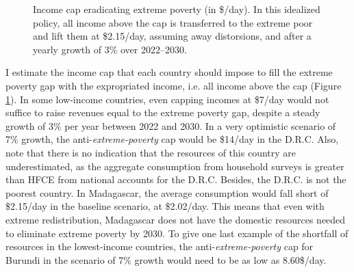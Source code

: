 \documentclass[12pt,english]{article}
\begin{document}
\begin{figure}[!b]
  \caption[Anti-\textit{extreme-poverty} cap in 2030 after 3\% growth.]{Income cap eradicating extreme poverty (in \$/day). In this idealized policy, all income above the cap is transferred to the extreme poor and lift them at \$2.15/day, assuming away distorsions, and after a yearly growth of 3\% over 2022--2030. %
  }\label{fig:antipoverty_cap}
\end{figure} 

I estimate the income cap that each country should impose to fill the extreme poverty gap with the expropriated income, i.e. all income above the cap (Figure \ref{fig:antipoverty_cap}). 
In some low-income countries, even capping incomes at \$7/day would not suffice to raise revenues equal to the extreme poverty gap, despite a steady growth of 3\% per year between 2022 and 2030. 
In a very optimistic scenario of 7\% growth, the anti-\textit{extreme-poverty} cap would be \$14/day in the D.R.C. Also, note that there is no indication that the resources of this country are underestimated, as the aggregate consumption from household surveys is greater than HFCE %
from national accounts for the D.R.C. 
Besides, the D.R.C. is not the poorest country. 
In Madagascar, the average consumption would fall short of \$2.15/day in the baseline scenario, at \$2.02/day. This means that even with extreme redistribution, Madagascar does not have the domestic resources needed to eliminate extreme poverty by 2030. 
To give one last example of the shortfall of resources in the lowest-income countries, the anti-\textit{extreme-poverty} cap for Burundi in the scenario of 7\% growth would need to be as low as 8.60\$/day. 
\end{document}
